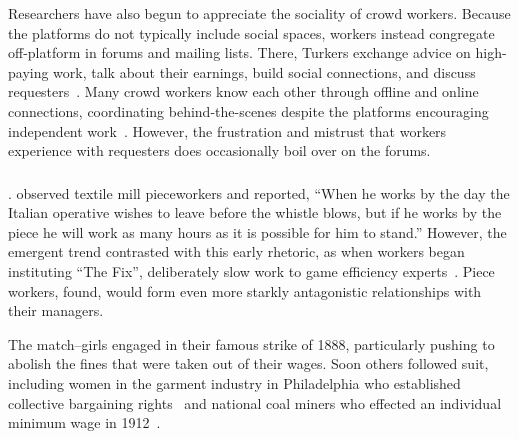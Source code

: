 \documentclass[trackingWork]{subfiles}
\begin{document}
Researchers have also begun to appreciate the sociality of crowd workers.
Because the platforms do not typically include social spaces, workers instead congregate off-platform in forums and mailing lists.
There, Turkers exchange advice on high-paying work, talk about their earnings, build social connections, and discuss requesters~\cite{martin2014being}.
Many crowd workers know each other through offline and online connections, coordinating behind-the-scenes despite the platforms encouraging independent work~\cite{crowdcollab,yin2016communication}.
However, the frustration and mistrust that workers experience with requesters does occasionally boil over on the forums. 


\subsubsection{\pieceworkpers}

\begin{comment}
notes: what info do i assume the reader has seen already?
- Clark: pieceworkers work harder, more diligently, etc...
- Riis saw terrible conditions, documented and communicated it to the world
- Worker advocacy groups arose to speak out against piecework
\end{comment}

.
\citeauthor{clark1908cotton} observed textile mill pieceworkers and reported,
``When he works by the day the Italian operative wishes to leave before the whistle blows,
but if he works by the piece he will work as many hours as it is possible for him to stand.''
However, the emergent trend contrasted with this early rhetoric, as
when workers began instituting ``The Fix'', deliberately slow work to game efficiency experts~\cite{roy1954efficiency}.
Piece workers, \citeauthor{roy1954efficiency} found, would form even more starkly antagonistic relationships with their managers.

The match--girls engaged in their famous strike of 1888, particularly pushing to abolish the fines that were taken out of their wages.
Soon others followed suit, including women in the garment industry in Philadelphia who established collective bargaining rights~\cite{10.2307/41829256} and national coal miners who effected an individual minimum wage in 1912~\cite{10.2307/2221944}.
\end{document}
